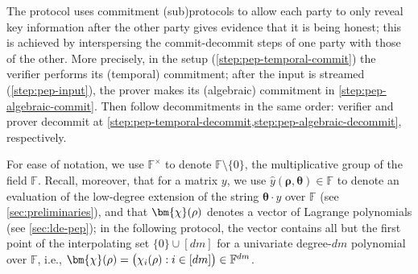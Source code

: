 \documentclass[a4paper,UKenglish,cleveref, autoref, thm-restate]{lipics-v2021}
\theoremstyle{definition}
\newcommand{\field}{\mathbb{F}}
\newcommand{\pcommitstring}{y}
\newcommand{\dimension}{m}
\newcommand{\degree}{d}
\newcommand{\fingerprinttuple}{\bm{\rho}}
\def\rfe#1{
    \ifnum#1=1
        \rho
    \else
    \ifnum#1=2
        \sigma
    \else
    \fi\fi
}
\begin{document}
The protocol uses commitment (sub)protocols to allow each party to only reveal key information after the other party gives evidence that it is being honest; this is achieved by interspersing the commit-decommit steps of one party with those of the other. More precisely, in the setup (\cref{step:pep-temporal-commit}) the verifier performs its (temporal) commitment; after the input is streamed (\cref{step:pep-input}), the prover makes its (algebraic) commitment in \cref{step:pep-algebraic-commit}. Then follow decommitments in the same order: verifier and prover decommit at \cref{step:pep-temporal-decommit,step:pep-algebraic-decommit}, respectively.

For ease of notation, we use $\field^\times$ to denote $\field \setminus \{0\}$, the multiplicative group of the field $\field$. Recall, moreover, that for a matrix $\pcommitstring$, we use $\hat \pcommitstring(\fingerprinttuple, \bm{\theta}) \in \field$ to denote an evaluation of the low-degree extension of the string $\bm{\theta} \cdot \pcommitstring$ over $\field$ (see \cref{sec:preliminaries}), and that $\bm{\chi}(\rfe1)$ denotes a vector of Lagrange polynomials (see \cref{sec:lde-pep}); in the following protocol, the vector contains all but the first point of the interpolating set $\{0\} \cup [\degree\dimension]$ for a univariate degree-$\degree\dimension$ polynomial over $\field$, i.e., $\bm{\chi}(\rfe1) = \big(\chi_i(\rfe1) : i \in [\degree\dimension] \big) \in \field^{\degree\dimension}$.
\end{document}
